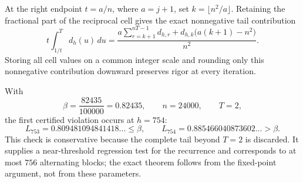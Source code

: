 \documentclass[11pt,letterpaper]{article}
\theoremstyle{definition}
\theoremstyle{remark}
\begin{document}
At the right endpoint $t=a/n$, where $a=j+1$, set $k=\lfloor n^2/a\rfloor$.
Retaining the fractional part of the reciprocal cell gives the exact nonnegative tail contribution
\begin{equation}\label{eq:endpoint-tail} t\int_{1/t}^{T}d_h(u)\,du=\frac{a\sum_{r=k+1}^{nT-1}d_{h,r}+d_{h,k}\bigl(a(k+1)-n^2\bigr)}{n^2}. \end{equation}
Storing all cell values on a common integer scale and rounding only this nonnegative contribution downward preserves rigor at every iteration.

With
\begin{equation}\label{eq:certificate-parameters} \beta=\frac{82435}{100000}=0.82435,\qquad n=24000,\qquad T=2, \end{equation}
the first certified violation occurs at $h=754$:
\begin{equation}\label{eq:certificate-values} L_{753}=0.809481094841418\ldots\le\beta,\qquad L_{754}=0.885466040873602\ldots>\beta. \end{equation}
This check is conservative because the complete tail beyond $T=2$ is discarded.
It supplies a near-threshold regression test for the recurrence and corresponds to at most $756$ alternating blocks; the exact theorem follows from the fixed-point argument, not from these parameters.



\end{document}
